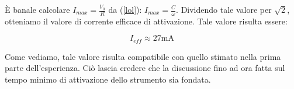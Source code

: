 \`E banale calcolare $I_{max}=\frac{V_0}{R}$ da (\ref{lol}): $I_{max}=\frac{C}{\omega}$. Dividendo tale valore per $\sqrt{2}$, otteniamo il valore di corrente efficace di attivazione. Tale valore risulta essere:

\begin{equation}
I_{eff} \approx 27 \si{\milli\ampere}
\end{equation}

Come vediamo, tale valore risulta compatibile con quello stimato nella prima parte dell'esperienza. Ciò lascia credere che la discussione fino ad ora fatta sul tempo minimo di attivazione dello strumento sia fondata. 